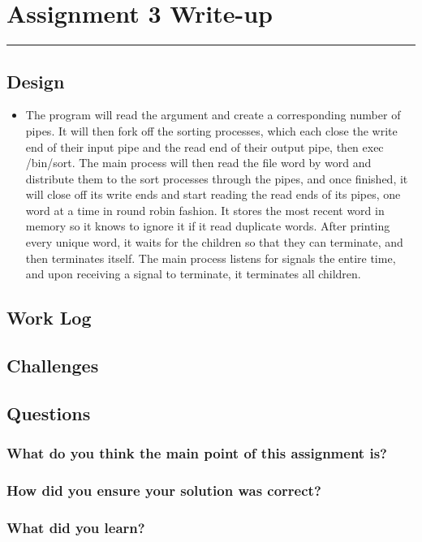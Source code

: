 \documentclass[letterpaper,10pt,fleqn]{article}
\numberwithin{equation}{section}
\begin{document}

\section*{Assignment 3 Write-up}
\hrule

\subsection*{Design}
\begin{itemize}
        \item The program will read the argument and create a corresponding number of pipes.  It will then fork off the sorting processes, which each close the write end of their input pipe and the read end of their output pipe, then exec /bin/sort.  The main process will then read the file word by word and distribute them to the sort processes through the pipes, and once finished, it will close off its write ends and start reading the read ends of its pipes, one word at a time in round robin fashion.  It stores the most recent word in memory so it knows to ignore it if it read duplicate words.  After printing every unique word, it waits for the children so that they can terminate, and then terminates itself.  The main process listens for signals the entire time, and upon receiving a signal to terminate, it terminates all children.
\end{itemize}

\subsection*{Work Log}

\subsection*{Challenges}

\subsection*{Questions}

\subsubsection*{What do you think the main point of this assignment is?}

\subsubsection*{How did you ensure your solution was correct?}

\subsubsection*{What did you learn?}
\end{document}

